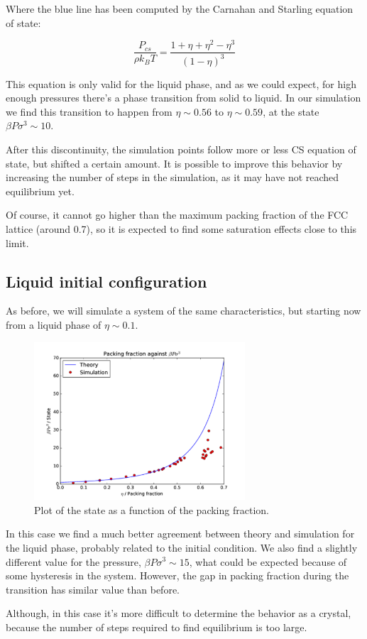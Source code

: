 \documentclass[10 pt]{article}
\begin{document}
Where the blue line has been computed by the Carnahan and Starling equation of state:

$$ \frac{P_{cs}}{\rho k_B T} = \frac{1 + \eta + \eta^2 - \eta^3}{(1-\eta)^3} $$

This equation is only valid for the liquid phase, and as we could expect, for high enough pressures there's a phase transition from solid to liquid. In our simulation we find this transition to happen from $\eta \sim 0.56$ to $\eta \sim 0.59$, at the state $\beta P \sigma^3 \sim 10$.

After this discontinuity, the simulation points follow more or less CS equation of state, but shifted a certain amount. It is possible to improve this behavior by increasing the number of steps in the simulation, as it may have not reached equilibrium yet.

Of course, it cannot go higher than the maximum packing fraction of the FCC lattice (around 0.7), so it is expected to find some saturation effects close to this limit.

\subsection{Liquid initial configuration}

As before, we will simulate a system of the same characteristics, but starting now from a liquid phase of $\eta \sim 0.1$.

\begin{figure}[H]
  \begin{center}
    \includegraphics[width=0.7\textwidth]{../graphs/liquid.pdf}
    \caption{Plot of the state as a function of the packing fraction.}
  \end{center}
\end{figure}

In this case we find a much better agreement between theory and simulation for the liquid phase, probably related to the initial condition. We also find a slightly different value for the pressure, $\beta P \sigma^3 \sim 15$, what could be expected because of some hysteresis in the system. However, the gap in packing fraction during the transition has similar value than before.

Although, in this case it's more difficult to determine the behavior as a crystal, because the number of steps required to find equilibrium is too large.
\end{document}
